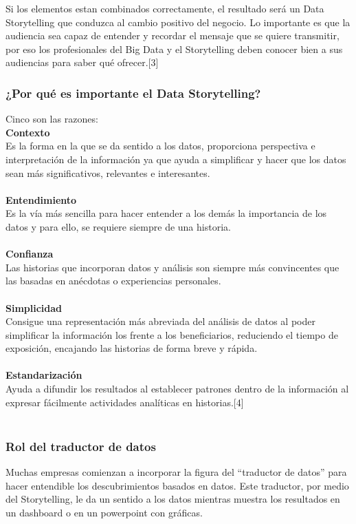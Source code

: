 \documentclass[twoside,twocolumn]{article}
\begin{document}
Si los elementos estan combinados correctamente, el resultado será un Data 
Storytelling que conduzca al cambio positivo del negocio. Lo importante es 
que la audiencia sea capaz de entender y recordar el mensaje que se quiere 
transmitir, por eso los profesionales del Big Data y el Storytelling deben 
conocer bien a sus audiencias para saber qué ofrecer.[3]

\subsubsection{¿Por qué es importante el Data Storytelling?}
Cinco son las razones: \\
\textbf{ Contexto } 
\\Es la forma en la que se da sentido a los 
datos, proporciona perspectiva e interpretación
 de la información ya que ayuda a simplificar y 
 hacer que los datos sean más significativos, 
 relevantes e interesantes.\\\\
\textbf{ Entendimiento } 
\\Es la vía más sencilla para hacer entender a 
los demás la importancia de los datos y para ello,
 se requiere siempre de una historia.\\\\
\textbf{ Confianza } 
\\ Las historias que incorporan datos y análisis
 son siempre más convincentes que las basadas en 
 anécdotas o experiencias personales. \\\\
\textbf{ Simplicidad } 
\\Consigue una representación más abreviada del 
análisis de datos al poder simplificar la 
información los frente a los beneficiarios, 
reduciendo el tiempo de exposición, encajando 
las historias de forma breve y rápida.\\\\
\textbf{ Estandarización } 
\\Ayuda a difundir los resultados al
 establecer patrones dentro de la información 
 al expresar fácilmente actividades analíticas 
 en historias.[4]\\\\


\subsubsection{Rol del traductor de datos}

Muchas empresas comienzan a incorporar la figura del “traductor de datos” para hacer entendible los descubrimientos basados en datos. Este traductor, por medio del Storytelling, le da un sentido a los datos mientras muestra los resultados en un dashboard o en un powerpoint con gráficas.  
\end{document}
